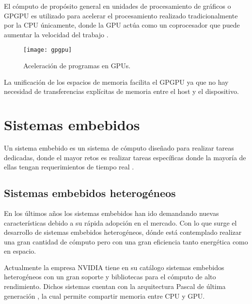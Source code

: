    \vspace{0.3cm}
   
    El cómputo  de propósito general en unidades de procesamiento de gráficos o \acrshort{GPGPU} es utilizado para acelerar el procesamiento realizado tradicionalmente por la \acrshort{CPU} únicamente, donde la \acrshort{GPU} actúa como un coprocesador que puede aumentar la velocidad del trabajo \cite{GpuCpu}.
    
     \begin{figure}[ht]
      \centering
        \texttt{[image: gpgpu]}
        \caption{Aceleración de programas en \acrshort{GPU}s\cite{gpgpu}.}
        \label{fig:gpgpu}
    \end{figure}
                
   \vspace{0.3cm}
   
    La unificación de los espacios de memoria facilita el \acrshort{GPGPU} ya que no hay necesidad de transferencias explícitas de memoria entre el host y el dispositivo.
    
    \section{Sistemas embebidos}

    Un sistema embebido es un sistema de cómputo diseñado para realizar tareas dedicadas, donde el mayor retos es realizar tareas específicas donde la mayoría de ellas tengan requerimientos de tiempo real \cite{LimPree}.

    \subsection{Sistemas embebidos heterogéneos} \label{sec:seh}
    \vspace{0.3cm}
    En los últimos años los sistemas embebidos han ido demandando nuevas características debido a su rápida adopción en el mercado. Con lo que surge el desarrollo de sistemas embebidos heterogéneos, dónde está contemplado realizar una gran cantidad de cómputo pero con una gran eficiencia tanto energética como en espacio.
    \vspace{0.3cm}

    Actualmente la empresa NVIDIA tiene en su catálogo sistemas embebidos heterogéneos con un gran soporte y bibliotecas para el cómputo de alto rendimiento. Dichos sistemas cuentan con la arquitectura Pascal de última generación \cite{GPUArt}, la cual permite compartir memoria entre \acrshort{CPU} y \acrshort{GPU}.
               
